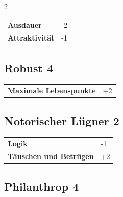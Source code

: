 \begin{multicols}{2}
\begin{tcolorbox}
\begin{tabular}{@{}ll@{}}
    \textbf{Ausdauer} & -2\\
    \textbf{Attraktivität} & -1\\
\end{tabular}


\end{tcolorbox}

\begin{tcolorbox}
    \subsection*{Robust \hfill \small{4 }}
    \tcblower




\begin{tabular}{@{}ll@{}}
    \textbf{Maximale Lebenspunkte} & +2\\
\end{tabular}


\end{tcolorbox}

\begin{tcolorbox}
    \subsection*{Notorischer Lügner \hfill \small{2 }}
    \tcblower




\begin{tabular}{@{}ll@{}}
    \textbf{Logik} & -1\\
    \textbf{Täuschen und Betrügen} & +2\\
\end{tabular}


\end{tcolorbox}

\begin{tcolorbox}
    \subsection*{Philanthrop \hfill \small{4 }}
    \tcblower





\end{tcolorbox}
\end{multicols}
